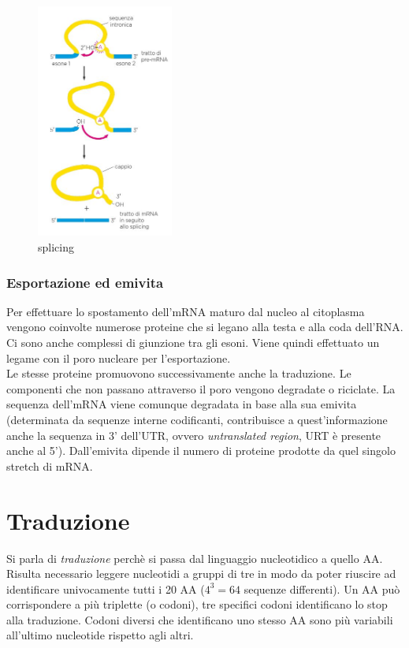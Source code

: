             \begin{figure}[h]
                \centering
                \includegraphics[width=0.4\textwidth]{images/splicing.JPG}
                \caption{\small splicing}
                \label{fig:mesh1}
            \end{figure}
            
        \subsubsection{Esportazione ed emivita}
            Per effettuare lo spostamento dell'mRNA maturo dal nucleo al citoplasma vengono coinvolte numerose proteine che si legano alla testa e alla coda dell'RNA. Ci sono anche complessi di giunzione tra gli esoni. Viene quindi effettuato un legame con il poro nucleare per l'esportazione. \\
            Le stesse proteine promuovono successivamente anche la traduzione. Le componenti che non passano attraverso il poro vengono degradate o riciclate. 
            La sequenza dell'mRNA viene comunque degradata in base alla sua emivita (determinata da sequenze interne codificanti, contribuisce a quest'informazione anche la sequenza in 3' dell'UTR, ovvero \textit{untranslated region}, URT è presente anche al 5'). Dall'emivita dipende il numero di proteine prodotte da quel singolo stretch di mRNA. 

\section{Traduzione}
    Si parla di \textit{traduzione} perchè si passa dal linguaggio nucleotidico a quello AA. Risulta necessario leggere nucleotidi a gruppi di tre in modo da poter riuscire ad identificare univocamente tutti i 20 AA ($4^{3} = 64$ sequenze differenti). Un AA può corrispondere a più triplette (o codoni), tre specifici codoni identificano lo stop alla traduzione.
    Codoni diversi che identificano uno stesso AA sono più variabili all'ultimo nucleotide rispetto agli altri.
